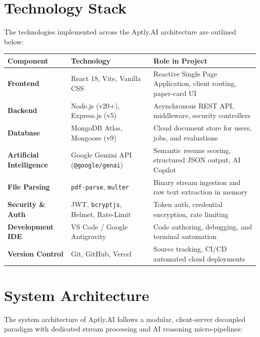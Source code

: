 \documentclass[12pt, a4paper]{article}
\begin{document}
\section{Technology Stack}
The technologies implemented across the Aptly.AI architecture are outlined below:

\vspace{0.2cm}
\begin{center}
\renewcommand{\arraystretch}{1.2}
\begin{tabularx}{\textwidth}{l p{5.0cm} X}
\toprule
\textbf{\color{primary}Component} & \textbf{\color{primary}Technology} & \textbf{\color{primary}Role in Project} \\
\midrule
\textbf{Frontend} & React 18, Vite, Vanilla CSS & Reactive Single Page Application, client routing, paper-card UI \\
\textbf{Backend} & Node.js (v20+), Express.js (v5) & Asynchronous REST API, middleware, security controllers \\
\textbf{Database} & MongoDB Atlas, Mongoose (v9) & Cloud document store for users, jobs, and evaluations \\
\textbf{Artificial Intelligence} & Google Gemini API (\texttt{@google/genai}) & Semantic resume scoring, structured JSON output, AI Copilot \\
\textbf{File Parsing} & \texttt{pdf-parse}, \texttt{multer} & Binary stream ingestion and raw text extraction in memory \\
\textbf{Security \& Auth} & JWT, \texttt{bcryptjs}, Helmet, Rate-Limit & Token auth, credential encryption, rate limiting \\
\textbf{Development IDE} & VS Code / Google Antigravity & Code authoring, debugging, and terminal automation \\
\textbf{Version Control} & Git, GitHub, Vercel & Source tracking, CI/CD automated cloud deployments \\
\bottomrule
\end{tabularx}
\end{center}

\newpage

\section{System Architecture}
The system architecture of Aptly.AI follows a modular, client-server decoupled paradigm with dedicated stream processing and AI reasoning micro-pipelines:
\end{document}
